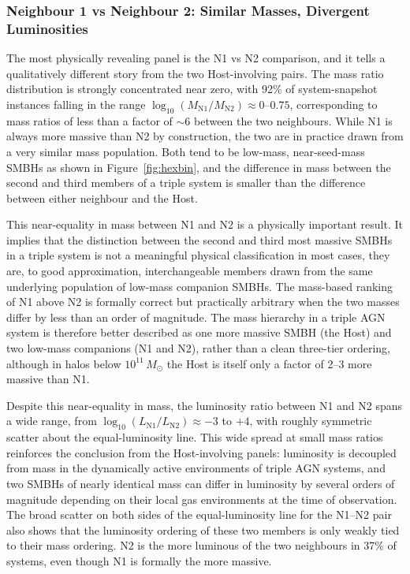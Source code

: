 \documentclass[twocolumn, 10pt]{article}
\begin{document}
\subsubsection{Neighbour 1 vs Neighbour 2: Similar Masses, Divergent Luminosities}
\label{subsubsec:ratio_n1n2}
 
The most physically revealing panel is the N1 vs N2 comparison, and it tells a qualitatively different story from the two Host-involving pairs. The mass ratio distribution is strongly concentrated near zero, with 92\% of system-snapshot instances falling in the range $\log_{10}(M_\mathrm{N1}/M_\mathrm{N2}) \approx 0$--$0.75$, corresponding to mass ratios of less than a factor of $\sim 6$ between the two neighbours. While N1 is always more massive than N2 by construction, the two are in practice drawn from a very similar mass population. Both tend to be low-mass, near-seed-mass SMBHs as shown in Figure~\ref{fig:hexbin}, and the difference in mass between the second and third members of a triple system is smaller than the difference between either neighbour and the Host.
 
This near-equality in mass between N1 and N2 is a physically important result. It implies that the distinction between the second and third most massive SMBHs in a triple system is not a meaningful physical classification in most cases, they are, to good approximation, interchangeable members drawn from the same underlying population of low-mass companion SMBHs. The mass-based ranking of N1 above N2 is formally correct but practically arbitrary when the two masses differ by less than an order of magnitude. The mass hierarchy in a triple AGN system is therefore better described as one more massive SMBH (the Host) and two low-mass companions (N1 and N2), rather than a clean three-tier ordering, although in halos below $10^{11}\,M_\odot$ the Host is itself only a factor of 2--3 more massive than N1.
 
Despite this near-equality in mass, the luminosity ratio between N1 and N2 spans a wide range, from $\log_{10}(L_\mathrm{N1}/L_\mathrm{N2}) \approx -3$ to $+4$, with roughly symmetric scatter about the equal-luminosity line. This wide spread at small mass ratios reinforces the conclusion from the Host-involving panels: luminosity is decoupled from mass in the dynamically active environments of triple AGN systems, and two SMBHs of nearly identical mass can differ in luminosity by several orders of magnitude depending on their local gas environments at the time of observation. The broad scatter on both sides of the equal-luminosity line for the N1--N2 pair also shows that the luminosity ordering of these two members is only weakly tied to their mass ordering. N2 is the more luminous of the two neighbours in 37\% of systems, even though N1 is formally the more massive.
 
\end{document}
